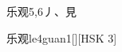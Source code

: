 \begin{entry}{乐观}{5,6}{⼃、⾒}
  \begin{phonetics}{乐观}{le4guan1}[][HSK 3]
  \end{phonetics}
\end{entry}
